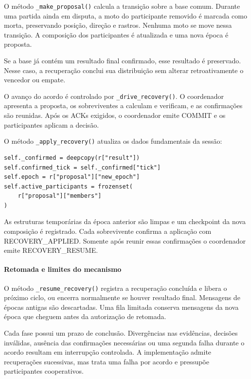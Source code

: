 \documentclass[11pt,a4paper]{article}
\begin{document}
O método \texttt{\_make\_proposal()} calcula a transição sobre a base comum. Durante uma partida ainda em disputa, a moto do participante removido é marcada como morta, preservando posição, direção e rastros. Nenhuma moto se move nessa transição. A composição dos participantes é atualizada e uma nova época é proposta.

Se a base já contém um resultado final confirmado, esse resultado é preservado. Nesse caso, a recuperação conclui sua distribuição sem alterar retroativamente o vencedor ou empate.

O avanço do acordo é controlado por \texttt{\_drive\_recovery()}. O coordenador apresenta a proposta, os sobreviventes a calculam e verificam, e as confirmações são reunidas. Após os ACKs exigidos, o coordenador emite COMMIT e os participantes aplicam a decisão.

O método \texttt{\_apply\_recovery()} atualiza os dados fundamentais da sessão:

\par\smallskip
\noindent
\begin{minipage}{\linewidth}
\begin{verbatim}
self._confirmed = deepcopy(r["result"])
self.confirmed_tick = self._confirmed["tick"]
self.epoch = r["proposal"]["new_epoch"]
self.active_participants = frozenset(
    r["proposal"]["members"]
)
\end{verbatim}
\end{minipage}
\par\smallskip

As estruturas temporárias da época anterior são limpas e um checkpoint da nova composição é registrado. Cada sobrevivente confirma a aplicação com RECOVERY\_APPLIED. Somente após reunir essas confirmações o coordenador emite RECOVERY\_RESUME.

\paragraph{Retomada e limites do mecanismo}

O método \texttt{\_resume\_recovery()} registra a recuperação concluída e libera o próximo ciclo, ou encerra normalmente se houver resultado final. Mensagens de épocas antigas são descartadas. Uma fila limitada conserva mensagens da nova época que cheguem antes da autorização de retomada.

Cada fase possui um prazo de conclusão. Divergências nas evidências, decisões inválidas, ausência das confirmações necessárias ou uma segunda falha durante o acordo resultam em interrupção controlada. A implementação admite recuperações sucessivas, mas trata uma falha por acordo e pressupõe participantes cooperativos.
\end{document}
